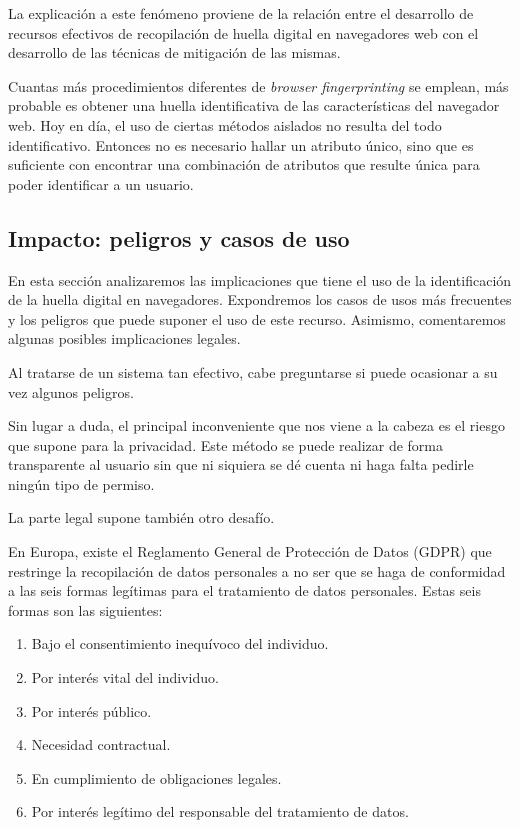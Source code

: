 La explicación a este fenómeno proviene de la relación entre el desarrollo de recursos efectivos de recopilación de huella digital en navegadores web con el desarrollo de las técnicas de mitigación de las mismas. \par 

Cuantas más procedimientos diferentes de \textit{browser fingerprinting} se emplean, más probable es obtener una huella identificativa de las características del navegador web. Hoy en día, el uso de ciertas métodos aislados no resulta del todo identificativo. Entonces no es necesario hallar un atributo único, sino que es suficiente con encontrar una combinación de atributos que resulte única para poder identificar a un usuario. \par

\subsection{Impacto: peligros y casos de uso}

En esta sección analizaremos las implicaciones que tiene el uso de la identificación de la huella digital en navegadores. Expondremos los casos de usos más frecuentes y los peligros que puede suponer el uso de este recurso. Asimismo, comentaremos algunas posibles implicaciones legales. \par

Al tratarse de un sistema tan efectivo, cabe preguntarse si puede ocasionar a su vez algunos peligros. \par

Sin lugar a duda, el principal inconveniente que nos viene a la cabeza es el riesgo que supone para la privacidad. Este método se puede realizar de forma transparente al usuario sin que ni siquiera se dé cuenta ni haga falta pedirle ningún tipo de permiso\cite{challenges}. \par 

La parte legal supone también otro desafío. \par

En Europa, existe el Reglamento General de Protección de Datos (GDPR) que restringe la recopilación de datos personales a no ser que se haga de conformidad a las seis formas legítimas para el tratamiento de datos personales. Estas seis formas son las siguientes: \par

\begin{enumerate}
\item Bajo el consentimiento inequívoco del individuo.
\item Por interés vital del individuo.
\item Por interés público.
\item Necesidad contractual.
\item En cumplimiento de obligaciones legales.
\item Por interés legítimo del responsable del tratamiento de datos.
\end{enumerate}

